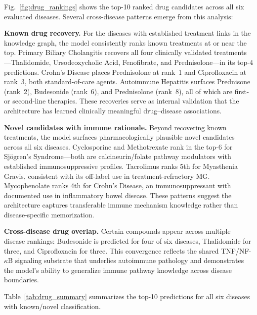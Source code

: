 \documentclass[conference]{IEEEtran}
\begin{document}
Fig.~\ref{fig:drug_rankings} shows the top-10 ranked drug candidates across all six evaluated diseases. Several cross-disease patterns emerge from this analysis:

\textbf{Known drug recovery.} For the diseases with established treatment links in the knowledge graph, the model consistently ranks known treatments at or near the top. Primary Biliary Cholangitis recovers all four clinically validated treatments---Thalidomide, Ursodeoxycholic Acid, Fenofibrate, and Prednisolone---in its top-4 predictions. Crohn's Disease places Prednisolone at rank~1 and Ciprofloxacin at rank~3, both standard-of-care agents. Autoimmune Hepatitis surfaces Prednisone (rank~2), Budesonide (rank~6), and Prednisolone (rank~8), all of which are first- or second-line therapies. These recoveries serve as internal validation that the architecture has learned clinically meaningful drug--disease associations.

\textbf{Novel candidates with immune rationale.} Beyond recovering known treatments, the model surfaces pharmacologically plausible novel candidates across all six diseases. Cyclosporine and Methotrexate rank in the top-6 for Sj\"{o}gren's Syndrome---both are calcineurin/folate pathway modulators with established immunosuppressive profiles. Tacrolimus ranks 5th for Myasthenia Gravis, consistent with its off-label use in treatment-refractory MG. Mycophenolate ranks 4th for Crohn's Disease, an immunosuppressant with documented use in inflammatory bowel disease. These patterns suggest the architecture captures transferable immune mechanism knowledge rather than disease-specific memorization.

\textbf{Cross-disease drug overlap.} Certain compounds appear across multiple disease rankings: Budesonide is predicted for four of six diseases, Thalidomide for three, and Ciprofloxacin for three. This convergence reflects the shared TNF/NF-$\kappa$B signaling substrate that underlies autoimmune pathology and demonstrates the model's ability to generalize immune pathway knowledge across disease boundaries.

Table~\ref{tab:drug_summary} summarizes the top-10 predictions for all six diseases with known/novel classification.
\end{document}
